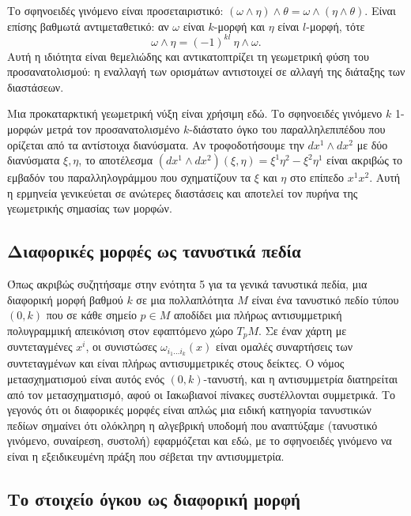 \documentclass[12pt]{article}
\begin{document}
Το σφηνοειδές γινόμενο είναι προσεταιριστικό: \( (\omega \wedge \eta) \wedge \theta = \omega \wedge (\eta \wedge \theta) \). Είναι επίσης βαθμωτά αντιμεταθετικό: αν \( \omega \) είναι \( k \)-μορφή και \( \eta \) είναι \( l \)-μορφή, τότε
\[
\omega \wedge \eta = (-1)^{kl} \ \eta \wedge \omega. \tag{42}
\]
Αυτή η ιδιότητα είναι θεμελιώδης και αντικατοπτρίζει τη γεωμετρική φύση του προσανατολισμού: η εναλλαγή των ορισμάτων αντιστοιχεί σε αλλαγή της διάταξης των διαστάσεων.

Μια προκαταρκτική γεωμετρική νύξη είναι χρήσιμη εδώ. Το σφηνοειδές γινόμενο \( k \) 1-μορφών μετρά τον προσανατολισμένο \( k \)-διάστατο όγκο του παραλληλεπιπέδου που ορίζεται από τα αντίστοιχα διανύσματα. Αν τροφοδοτήσουμε την \( dx^1 \wedge dx^2 \) με δύο διανύσματα \( \xi, \eta \), το αποτέλεσμα \( (dx^1 \wedge dx^2)(\xi, \eta) = \xi^1 \eta^2 - \xi^2 \eta^1 \) είναι ακριβώς το εμβαδόν του παραλληλογράμμου που σχηματίζουν τα \( \xi \) και \( \eta \) στο επίπεδο \( x^1 x^2 \). Αυτή η ερμηνεία γενικεύεται σε ανώτερες διαστάσεις και αποτελεί τον πυρήνα της γεωμετρικής σημασίας των μορφών.

\subsection{Διαφορικές μορφές ως τανυστικά πεδία}

Όπως ακριβώς συζητήσαμε στην ενότητα 5 για τα γενικά τανυστικά πεδία, μια διαφορική μορφή βαθμού \( k \) σε μια πολλαπλότητα \( M \) είναι ένα τανυστικό πεδίο τύπου \( (0,k) \) που σε κάθε σημείο \( p \in M \) αποδίδει μια πλήρως αντισυμμετρική πολυγραμμική απεικόνιση στον εφαπτόμενο χώρο \( T_pM \). Σε έναν χάρτη με συντεταγμένες \( x^i \), οι συνιστώσες \( \omega_{i_1 \dots i_k}(x) \) είναι ομαλές συναρτήσεις των συντεταγμένων και είναι πλήρως αντισυμμετρικές στους δείκτες. Ο νόμος μετασχηματισμού είναι αυτός ενός \( (0,k) \)-τανυστή, και η αντισυμμετρία διατηρείται από τον μετασχηματισμό, αφού οι Ιακωβιανοί πίνακες συστέλλονται συμμετρικά. Το γεγονός ότι οι διαφορικές μορφές είναι απλώς μια ειδική κατηγορία τανυστικών πεδίων σημαίνει ότι ολόκληρη η αλγεβρική υποδομή που αναπτύξαμε (τανυστικό γινόμενο, συναίρεση, συστολή) εφαρμόζεται και εδώ, με το σφηνοειδές γινόμενο να είναι η εξειδικευμένη πράξη που σέβεται την αντισυμμετρία.

\subsection{Το στοιχείο όγκου ως διαφορική μορφή}
\end{document}
